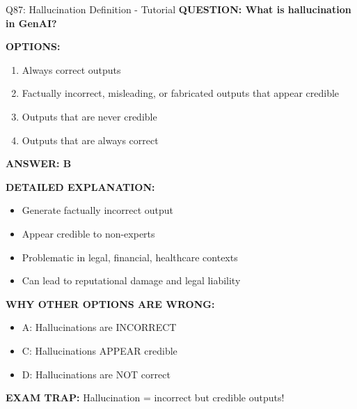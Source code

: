 \documentclass[8pt]{beamer}
\begin{document}
	\begin{frame}{Q87: Hallucination Definition - Tutorial}
		\fontsize{6.5}{7.5}\selectfont
		\textbf{QUESTION: What is hallucination in GenAI?}
		
		\vspace{0.1cm}
		\textbf{OPTIONS:}
		\begin{enumerate}
			\item Always correct outputs
			\item Factually incorrect, misleading, or fabricated outputs that appear credible
			\item Outputs that are never credible
			\item Outputs that are always correct
		\end{enumerate}
		
		\vspace{0.1cm}
		\textcolor{myblue}{\textbf{ANSWER: B}}
		
		\vspace{0.1cm}
		\textbf{DETAILED EXPLANATION:}
		\begin{itemize}
			\item Generate factually incorrect output
			\item Appear credible to non-experts
			\item Problematic in legal, financial, healthcare contexts
			\item Can lead to reputational damage and legal liability
		\end{itemize}
		
		\vspace{0.1cm}
		\textcolor{myred}{\textbf{WHY OTHER OPTIONS ARE WRONG:}}
		\begin{itemize}
			\item \textcolor{myred}{A:} Hallucinations are INCORRECT
			\item \textcolor{myred}{C:} Hallucinations APPEAR credible
			\item \textcolor{myred}{D:} Hallucinations are NOT correct
		\end{itemize}
		
		\textcolor{myred}{\textbf{EXAM TRAP:}} Hallucination = \textcolor{myblue}{incorrect but credible outputs}!
	\end{frame}
	
\end{document}
